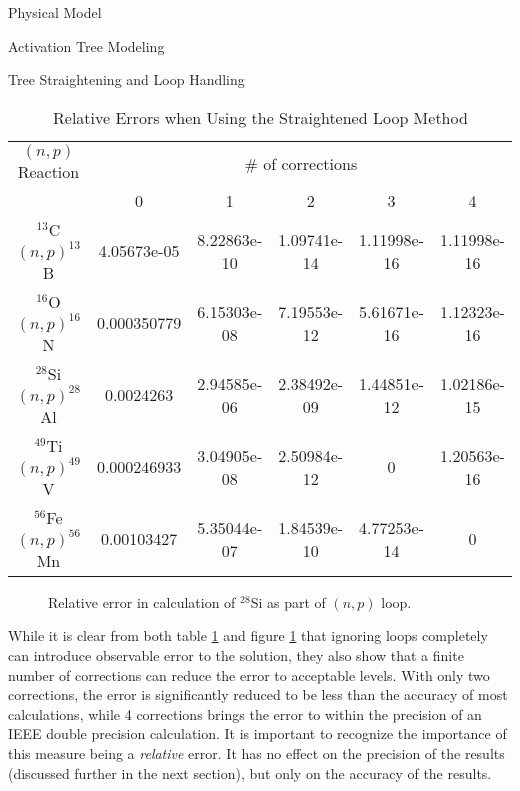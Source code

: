 \begin{chapter}{Physical Model\label{chap:physical}}
\begin{section}{Activation Tree Modeling\label{sec:physical.chains}}
\begin{subsection}{Tree Straightening and Loop Handling\label{sec:physical.chains.loops}}
    \begin{table}
      \begin{center}
        \caption{Relative Errors when Using the Straightened Loop
          Method}\label{tab:physical.loop_error}
        \begin{tabular}{|c|c|c|c|c|c|} \hline
          $(n,p)$ Reaction & \multicolumn{5}{c|}{\# of
            corrections}\\\cline{2-6}
          & 0 & 1 & 2 & 3 & 4 \\\hline\hline
          $^{13}$C$(n,p)^{13}$B & 4.05673e-05 & 8.22863e-10 & 1.09741e-14 &
          1.11998e-16 & 1.11998e-16\\\hline
          $^{16}$O$(n,p)^{16}$N & 0.000350779 & 6.15303e-08 & 7.19553e-12 &
          5.61671e-16 & 1.12323e-16 \\\hline
          $^{28}$Si$(n,p)^{28}$Al & 0.0024263 & 2.94585e-06 & 2.38492e-09 &
          1.44851e-12 & 1.02186e-15 \\\hline
          $^{49}$Ti$(n,p)^{49}$V & 0.000246933 & 3.04905e-08 & 2.50984e-12 & 0 &
          1.20563e-16\\\hline
          $^{56}$Fe$(n,p)^{56}$Mn & 0.00103427 & 5.35044e-07 & 1.84539e-10 &
          4.77253e-14 & 0\\\hline\hline
        \end{tabular}
      \end{center}
    \end{table}
    
    \begin{figure}[htb]
      \begin{center}
        \leavevmode
        \caption{Relative error in calculation of $^{28}$Si as part of $(n,p)$ loop.}
        \label{fig:physical.loop_error}
      \end{center}
    \end{figure}

    While it is clear from both table \ref{tab:physical.loop_error}
    and figure \ref{fig:physical.loop_error} that ignoring loops
    completely can introduce observable error to the solution, they
    also show that a finite number of corrections can reduce the error
    to acceptable levels.  With only two corrections, the error is
    significantly reduced to be less than the accuracy of most
    calculations, while 4 corrections brings the error to within the
    precision of an IEEE double precision calculation.  It is
    important to recognize the importance of this measure being a
    \textsl{relative} error.  It has no effect on the precision of the
    results (discussed further in the next section), but only on the
    accuracy of the results.
    

\end{subsection}
\end{section}
\end{chapter}
